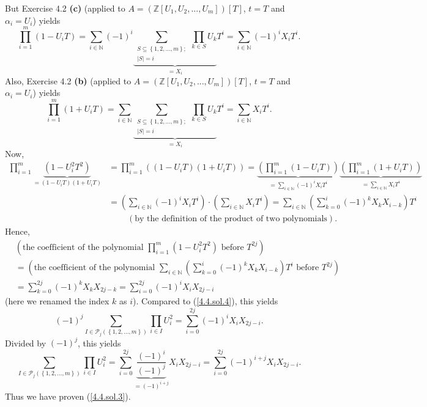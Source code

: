 \documentclass[numbers=enddot,12pt,final,onecolumn,notitlepage]{scrartcl}%
\begin{document}
But Exercise 4.2 \textbf{(c)} (applied to $A=\left(  \mathbb{Z}\left[
U_{1},U_{2},...,U_{m}\right]  \right)  \left[  T\right]  $, $t=T$ and
$\alpha_{i}=U_{i}$) yields%
\[
\prod\limits_{i=1}^{m}\left(  1-U_{i}T\right)  =\sum_{i\in\mathbb{N}}\left(
-1\right)  ^{i}\underbrace{\sum\limits_{\substack{S\subseteq\left\{
1,2,...,m\right\}  ;\\\left\vert S\right\vert =i}}\prod\limits_{k\in S}U_{k}%
}_{=X_{i}}T^{i}=\sum_{i\in\mathbb{N}}\left(  -1\right)  ^{i}X_{i}T^{i}.
\]
Also, Exercise 4.2 \textbf{(b)} (applied to $A=\left(  \mathbb{Z}\left[
U_{1},U_{2},...,U_{m}\right]  \right)  \left[  T\right]  $, $t=T$ and
$\alpha_{i}=U_{i}$) yields%
\[
\prod\limits_{i=1}^{m}\left(  1+U_{i}T\right)  =\sum_{i\in\mathbb{N}%
}\underbrace{\sum\limits_{\substack{S\subseteq\left\{  1,2,...,m\right\}
;\\\left\vert S\right\vert =i}}\prod\limits_{k\in S}U_{k}}_{=X_{i}}T^{i}%
=\sum_{i\in\mathbb{N}}X_{i}T^{i}.
\]
Now,%
\begin{align*}
\prod\limits_{i=1}^{m}\underbrace{\left(  1-U_{i}^{2}T^{2}\right)  }_{=\left(
1-U_{i}T\right)  \left(  1+U_{i}T\right)  }  &  =\prod\limits_{i=1}^{m}\left(
\left(  1-U_{i}T\right)  \left(  1+U_{i}T\right)  \right)
=\underbrace{\left(  \prod\limits_{i=1}^{m}\left(  1-U_{i}T\right)  \right)
}_{=\sum\limits_{i\in\mathbb{N}}\left(  -1\right)  ^{i}X_{i}T^{i}%
}\underbrace{\left(  \prod\limits_{i=1}^{m}\left(  1+U_{i}T\right)  \right)
}_{=\sum\limits_{i\in\mathbb{N}}X_{i}T^{i}}\\
&  =\left(  \sum\limits_{i\in\mathbb{N}}\left(  -1\right)  ^{i}X_{i}%
T^{i}\right)  \cdot\left(  \sum\limits_{i\in\mathbb{N}}X_{i}T^{i}\right)
=\sum\limits_{i\in\mathbb{N}}\left(  \sum_{k=0}^{i}\left(  -1\right)
^{k}X_{k}X_{i-k}\right)  T^{i}\\
&  \ \ \ \ \ \ \ \ \ \ \left(  \text{by the definition of the product of two
polynomials}\right)  .
\end{align*}
Hence,
\begin{align*}
&  \left(  \text{the coefficient of the polynomial }\prod\limits_{i=1}%
^{m}\left(  1-U_{i}^{2}T^{2}\right)  \text{ before }T^{2j}\right) \\
&  =\left(  \text{the coefficient of the polynomial }\sum\limits_{i\in
\mathbb{N}}\left(  \sum_{k=0}^{i}\left(  -1\right)  ^{k}X_{k}X_{i-k}\right)
T^{i}\text{ before }T^{2j}\right) \\
&  =\sum\limits_{k=0}^{2j}\left(  -1\right)  ^{k}X_{k}X_{2j-k}=\sum
\limits_{i=0}^{2j}\left(  -1\right)  ^{i}X_{i}X_{2j-i}%
\end{align*}
(here we renamed the index $k$ as $i$). Compared to (\ref{4.4.sol.4}), this
yields%
\[
\left(  -1\right)  ^{j}\sum\limits_{I\in\mathcal{P}_{j}\left(  \left\{
1,2,...,m\right\}  \right)  }\prod\limits_{i\in I}U_{i}^{2}=\sum
\limits_{i=0}^{2j}\left(  -1\right)  ^{i}X_{i}X_{2j-i}.
\]
Divided by $\left(  -1\right)  ^{j}$, this yields%
\[
\sum\limits_{I\in\mathcal{P}_{j}\left(  \left\{  1,2,...,m\right\}  \right)
}\prod\limits_{i\in I}U_{i}^{2}=\sum\limits_{i=0}^{2j}\underbrace{\dfrac
{\left(  -1\right)  ^{i}}{\left(  -1\right)  ^{j}}}_{=\left(  -1\right)
^{i+j}}X_{i}X_{2j-i}=\sum\limits_{i=0}^{2j}\left(  -1\right)  ^{i+j}%
X_{i}X_{2j-i}.
\]
Thus we have proven (\ref{4.4.sol.3}).
\end{document}
